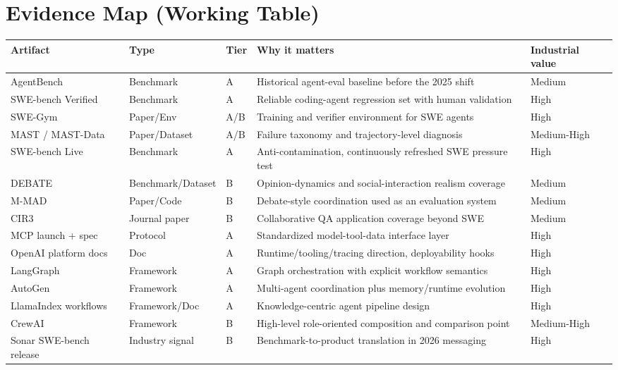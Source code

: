 \documentclass[11pt]{article}
\begin{document}
\section*{Evidence Map (Working Table)}
\begin{table}[t]
\small
\centering
\begin{tabular}{>{\raggedright\arraybackslash}p{} >{\raggedright\arraybackslash}p{} >{\raggedright\arraybackslash}p{} >{\raggedright\arraybackslash}p{} >{\raggedright\arraybackslash}p{}}
\toprule
Artifact & Type & Tier & Why it matters & Industrial value \\
\midrule
AgentBench & Benchmark & A & Historical agent-eval baseline before the 2025 shift & Medium \\
SWE-bench Verified & Benchmark & A & Reliable coding-agent regression set with human validation & High \\
SWE-Gym & Paper/Env & A/B & Training and verifier environment for SWE agents & High \\
MAST / MAST-Data & Paper/Dataset & A/B & Failure taxonomy and trajectory-level diagnosis & Medium-High \\
SWE-bench Live & Benchmark & A & Anti-contamination, continuously refreshed SWE pressure test & High \\
DEBATE & Benchmark/Dataset & B & Opinion-dynamics and social-interaction realism coverage & Medium \\
M-MAD & Paper/Code & B & Debate-style coordination used as an evaluation system & Medium \\
CIR3 & Journal paper & B & Collaborative QA application coverage beyond SWE & Medium \\
MCP launch + spec & Protocol & A & Standardized model-tool-data interface layer & High \\
OpenAI platform docs & Doc & A & Runtime/tooling/tracing direction, deployability hooks & High \\
LangGraph & Framework & A & Graph orchestration with explicit workflow semantics & High \\
AutoGen & Framework & A & Multi-agent coordination plus memory/runtime evolution & High \\
LlamaIndex workflows & Framework/Doc & A & Knowledge-centric agent pipeline design & High \\
CrewAI & Framework & B & High-level role-oriented composition and comparison point & Medium-High \\
Sonar SWE-bench release & Industry signal & B & Benchmark-to-product translation in 2026 messaging & High \\
\bottomrule
\end{tabular}
\end{table}
\end{document}
